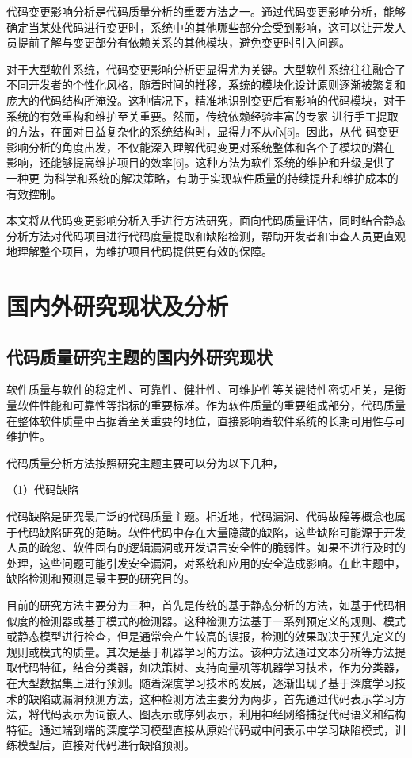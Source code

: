 代码变更影响分析是代码质量分析的重要方法之一。通过代码变更影响分析，能够确定当某处代码进行变更时，系统中的其他哪些部分会受到影响，这可以让开发人员提前了解与变更部分有依赖关系的其他模块，避免变更时引入问题。

对于大型软件系统，代码变更影响分析更显得尤为关键。大型软件系统往往融合了不同开发者的个性化风格，随着时间的推移，系统的模块化设计原则逐渐被繁复和庞大的代码结构所淹没。这种情况下，精准地识别变更后有影响的代码模块，对于系统的有效重构和维护至关重要。然而，传统依赖经验丰富的专家
进行手工提取的方法，在面对日益复杂化的系统结构时，显得力不从心[5]。因此，从代
码变更影响分析的角度出发，不仅能深入理解代码变更对系统整体和各个子模块的潜在
影响，还能够提高维护项目的效率[6]。这种方法为软件系统的维护和升级提供了一种更
为科学和系统的解决策略，有助于实现软件质量的持续提升和维护成本的有效控制。

本文将从代码变更影响分析入手进行方法研究，面向代码质量评估，同时结合静态分析方法对代码项目进行代码度量提取和缺陷检测，帮助开发者和审查人员更直观地理解整个项目，为维护项目代码提供更有效的保障。

\section{国内外研究现状及分析}


\subsection{代码质量研究主题的国内外研究现状}

软件质量与软件的稳定性、可靠性、健壮性、可维护性等关键特性密切相关，是衡量软件性能和可靠性等指标的重要标准。作为软件质量的重要组成部分，代码质量在整体软件质量中占据着至关重要的地位，直接影响着软件系统的长期可用性与可维护性。

代码质量分析方法按照研究主题主要可以分为以下几种，

（1）代码缺陷

代码缺陷是研究最广泛的代码质量主题。相近地，代码漏洞、代码故障等概念也属于代码缺陷研究的范畴。软件代码中存在大量隐藏的缺陷，这些缺陷可能源于开发人员的疏忽、软件固有的逻辑漏洞或开发语言安全性的脆弱性。如果不进行及时的处理，这些问题可能引发安全漏洞，对系统和应用的安全造成影响。在此主题中，缺陷检测和预测是最主要的研究目的。

目前的研究方法主要分为三种，首先是传统的基于静态分析的方法，如基于代码相似度的检测器\cite{Sheneamer2018A,2014A}或基于模式的检测器\cite{2012Mitigating,2017IDE,2016How}。这种检测方法基于一系列预定义的规则、模式或静态模型进行检查，但是通常会产生较高的误报，检测的效果取决于预先定义的规则或模式的质量。其次是基于机器学习的方法。该种方法通过文本分析等方法提取代码特征，结合分类器，如决策树、支持向量机等机器学习技术\cite{2017Assessment,2018A,2020The}，作为分类器，在大型数据集上进行预测。随着深度学习技术的发展，逐渐出现了基于深度学习技术的缺陷或漏洞预测方法，这种检测方法主要分为两步，首先通过代码表示学习方法，将代码表示为词嵌入、图表示或序列表示，利用神经网络捕捉代码语义和结构特征。通过端到端的深度学习模型直接从原始代码或中间表示中学习缺陷模式，训练模型后，直接对代码进行缺陷预测。


